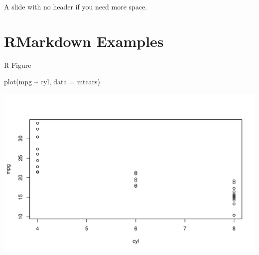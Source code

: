 \documentclass[10pt,ignorenonframetext,aspectratio=169]{beamer}
\newenvironment{Shaded}{\begin{snugshade}}{\end{snugshade}}
\newcommand{\AttributeTok}[1]{\textcolor[rgb]{0.77,0.63,0.00}{#1}}
\newcommand{\FunctionTok}[1]{\textcolor[rgb]{0.00,0.00,0.00}{#1}}
\newcommand{\NormalTok}[1]{#1}
\newcommand{\SpecialCharTok}[1]{\textcolor[rgb]{0.00,0.00,0.00}{#1}}
\renewenvironment{Shaded}{\color{black}\begin{snugshade}\color{black}}{\end{snugshade}}
\begin{document}
\begin{frame}
A slide with no header if you need more space.
\end{frame}

\hypertarget{rmarkdown-examples}{%
\section{RMarkdown Examples}\label{rmarkdown-examples}}

\begin{frame}[fragile]{R Figure}
\protect\hypertarget{r-figure}{}
\begin{Shaded}
\begin{Highlighting}[]
\FunctionTok{plot}\NormalTok{(mpg }\SpecialCharTok{\textasciitilde{}}\NormalTok{ cyl, }\AttributeTok{data =}\NormalTok{ mtcars)}
\end{Highlighting}
\end{Shaded}

\includegraphics{Untitled_files/figure-beamer/mtcarsboxplot-1.pdf}
\end{frame}
\end{document}
